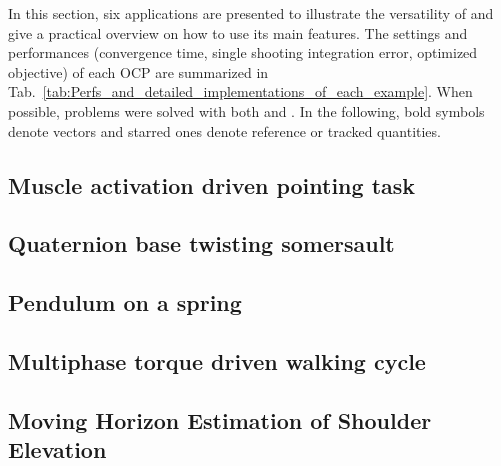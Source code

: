 In this section, six applications are presented to illustrate the versatility of \bioptim and give a practical overview on how to use its main features.
The settings and performances (convergence time, single shooting integration error, optimized objective) of each OCP are summarized in Tab.~\ref{tab:Perfs_and_detailed_implementations_of_each_example}. 
When possible, problems were solved with both \ipopt and \acados.
In the following, bold symbols denote vectors and starred ones denote reference or tracked quantities.


\subsection{Muscle activation driven pointing task}\label{ex:poiting}


\subsection{Quaternion base twisting somersault}\label{ex:somersault}


\subsection{Pendulum on a spring}\label{ex:spring}


\subsection{Multiphase torque driven walking cycle}\label{ex:walking}


\subsection{Moving Horizon Estimation of Shoulder Elevation}\label{ex:mhe}


